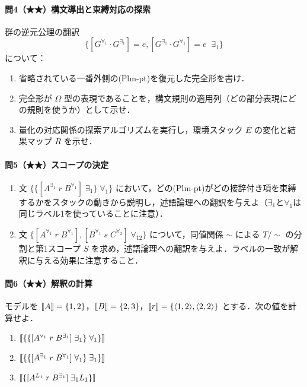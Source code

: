 \documentclass[../../main-detail.tex]{subfiles}
\begin{document}
\paragraph{問4（★★）構文導出と束縛対応の探索}
群の逆元公理の翻訳
\[
    \{[G^{\forall_1} \cdot G^{\exists_1}] = e\mathbin{,} [G^{\exists_1} \cdot G^{\forall_1}] = e\;\; \exists_1\}
\]
について：
\begin{enumerate}[label=(\alph*)]
    \item 省略されている一番外側の(Plm-pt)を復元した完全形を書け．
    \item 完全形が $\Omega$ 型の表現であることを，構文規則の適用列（どの部分表現にどの規則を使うか）として示せ．
    \item 量化の対応関係の探索アルゴリズムを実行し，環境スタック $E$ の変化と結果マップ $R$ を示せ．
\end{enumerate}

\paragraph{問5（★★）スコープの決定}
\begin{enumerate}[label=(\alph*)]
    \item 文 $\{\{[A^{\exists_1}\; r\; B^{\forall_1}]\;\exists_1\}\;\forall_1\}$ において，どの(Plm-pt)がどの接辞付き項を束縛するかをスタックの動きから説明し，述語論理への翻訳を与えよ（$\exists_1$と$\forall_1$は同じラベル1を使っていることに注意）．
    \item 文 $\{[A^{\forall_1}\; r\; B^{\forall_1}]\mathbin{,} [B^{\forall_1}\; s\; C^{\forall_2}]\;\forall_{12}\}$ について，同値関係 $\sim$ による $T/{\sim}$ の分割と第1スコープ $S$ を求め，述語論理への翻訳を与えよ．ラベルの一致が解釈に与える効果に注意すること．
\end{enumerate}

\paragraph{問6（★★）解釈の計算}
モデルを $\llbracket A\rrbracket = \{1,2\}$，$\llbracket B\rrbracket = \{2,3\}$，$\llbracket r\rrbracket = \{\langle 1,2\rangle, \langle 2,2\rangle\}$ とする．次の値を計算せよ．
\begin{enumerate}[label=(\alph*)]
    \item $\llbracket \{\{[A^{\forall_1}\; r\; B^{\exists_1}]\;\exists_1\}\;\forall_1\} \rrbracket$
    \item $\llbracket \{\{[A^{\exists_1}\; r\; B^{\forall_1}]\;\forall_1\}\;\exists_1\} \rrbracket$
    \item $\llbracket \{[A^{L_1}\; r\; B^{\exists_1}]\;\exists_1 L_1\} \rrbracket$
\end{enumerate}
\end{document}

